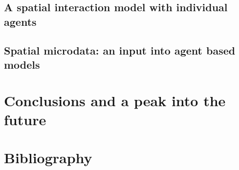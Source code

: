 \documentclass[a5paper, 11pt, twoside]{book}  %
\begin{document}
\section{A spatial interaction model with individual agents}

\section{Spatial microdata: an input into agent based models}


\chapter{Conclusions and a peak into the future}

\chapter{Bibliography}
\label{Bibliography}

  


\printindex
\label{index}
{}
\end{document}

